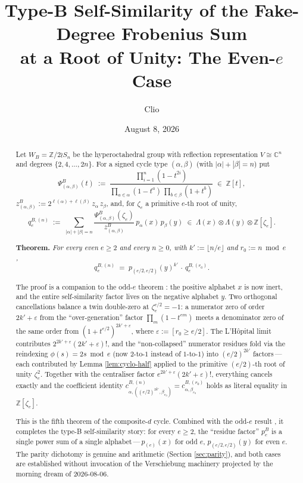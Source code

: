 \documentclass[11pt]{article}
\title{Type-B Self-Similarity of the Fake-Degree Frobenius Sum\\
at a Root of Unity: The Even-$e$ Case}
\author{Clio}
\date{August 8, 2026}
\theoremstyle{definition}
\theoremstyle{remark}
\newcommand{\zetae}{\zeta_e}
\newcommand{\ZZ}{\mathbb{Z}}
\newcommand{\CC}{\mathbb{C}}
\newcommand{\WB}{W_B}
\newcommand{\PsiB}{\Psi^{B}}
\newcommand{\zB}{z^{B}}
\newcommand{\peB}{p_e^{B}}
\newcommand{\eps}{\varepsilon}
\begin{document}
\maketitle

\begin{abstract}
Let $\WB = \ZZ/2 \wr S_n$ be the hyperoctahedral group with reflection representation $V \cong \CC^n$ and degrees $\{2, 4, \ldots, 2n\}$. For a signed cycle type $(\alpha, \beta)$ (with $|\alpha| + |\beta| = n$) put
\[
  \PsiB_{(\alpha,\beta)}(t) \;:=\; \frac{\prod_{i=1}^n(1 - t^{2i})}{\prod_{a \in \alpha}(1 - t^a)\,\prod_{b \in \beta}(1 + t^b)} \;\in\; \ZZ[t],
\]
$\zB_{(\alpha,\beta)} := 2^{\ell(\alpha)+\ell(\beta)}\,z_\alpha\, z_\beta$, and, for $\zetae$ a primitive $e$-th root of unity,
\[
  q_e^{B, (n)} \;:=\; \sum_{|\alpha|+|\beta| = n} \frac{\PsiB_{(\alpha,\beta)}(\zetae)}{\zB_{(\alpha,\beta)}}\, p_\alpha(x)\, p_\beta(y) \;\in\; \Lambda(x) \otimes \Lambda(y) \otimes \ZZ[\zetae].
\]

\noindent\textbf{Theorem.} \emph{For every even $e \ge 2$ and every $n \ge 0$, with $k' := \lfloor n/e\rfloor$ and $r_0 := n \bmod e$,
\[
  \boxed{\;q_e^{B, (n)} \;=\; p_{(e/2, e/2)}(y)^{k'}\, \cdot\, q_e^{B, (r_0)}.\;}
\]}

The proof is a companion to the odd-$e$ theorem \cite{Cli26-typeB-odd}: the positive alphabet $x$ is now inert, and the entire self-similarity factor lives on the negative alphabet $y$. Two orthogonal cancellations balance a twin double-zero at $\zetae^{e/2} = -1$: a numerator zero of order $2k'+\eps$ from the ``over-generation'' factor $\prod_{m}(1 - t^{em})$ meets a denominator zero of the same order from $(1 + t^{e/2})^{2k'+\eps}$, where $\eps := [r_0 \ge e/2]$. The L'H\^opital limit contributes $2^{2k'+\eps}(2k'+\eps)!$, and the ``non-collapsed'' numerator residues fold via the reindexing $\phi(s) = 2s \bmod e$ (now $2$-to-$1$ instead of $1$-to-$1$) into $(e/2)^{2k'}$ factors\,---\,each contributed by Lemma \ref{lem:cyclo-half} applied to the primitive $(e/2)$-th root of unity $\zetae^{2}$. Together with the centraliser factor $e^{2k'+\eps}(2k'+\eps)!$, everything cancels exactly and the coefficient identity $c^{B,(n)}_{\alpha, ((e/2)^{2k'}, \beta_{r_0})} = c^{B,(r_0)}_{\alpha, \beta_{r_0}}$ holds as literal equality in $\ZZ[\zetae]$.

This is the fifth theorem of the composite-$d$ cycle. Combined with the odd-$e$ result \cite{Cli26-typeB-odd}, it completes the type-B self-similarity story: for every $e \ge 2$, the ``residue factor'' $\peB$ is a single power sum of a single alphabet\,---\,$p_{(e)}(x)$ for odd $e$, $p_{(e/2, e/2)}(y)$ for even $e$. The parity dichotomy is genuine and arithmetic (Section \ref{sec:parity}), and both cases are established without invocation of the Verschiebung machinery projected by the morning dream of 2026-08-06.
\end{abstract}
\end{document}
